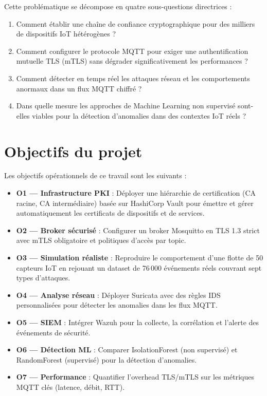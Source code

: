 Cette problématique se décompose en quatre sous-questions directrices :

\begin{enumerate}
  \item Comment établir une chaîne de confiance cryptographique pour des milliers de dispositifs IoT hétérogènes ?
  \item Comment configurer le protocole MQTT pour exiger une authentification mutuelle TLS (mTLS) sans dégrader significativement les performances ?
  \item Comment détecter en temps réel les attaques réseau et les comportements anormaux dans un flux MQTT chiffré ?
  \item Dans quelle mesure les approches de Machine Learning non supervisé sont-elles viables pour la détection d'anomalies dans des contextes IoT réels ?
\end{enumerate}

\section{Objectifs du projet}

Les objectifs opérationnels de ce travail sont les suivants :

\begin{itemize}
  \item \textbf{O1 — Infrastructure PKI} : Déployer une hiérarchie de certification (CA racine, CA intermédiaire) basée sur HashiCorp Vault pour émettre et gérer automatiquement les certificats de dispositifs et de services.
  \item \textbf{O2 — Broker sécurisé} : Configurer un broker Mosquitto en TLS 1.3 strict avec mTLS obligatoire et politiques d'accès par topic.
  \item \textbf{O3 — Simulation réaliste} : Reproduire le comportement d'une flotte de 50 capteurs IoT en rejouant un dataset de 76\,000 événements réels couvrant sept types d'attaques.
  \item \textbf{O4 — Analyse réseau} : Déployer Suricata avec des règles IDS personnalisées pour détecter les anomalies dans les flux MQTT.
  \item \textbf{O5 — SIEM} : Intégrer Wazuh pour la collecte, la corrélation et l'alerte des événements de sécurité.
  \item \textbf{O6 — Détection ML} : Comparer IsolationForest (non supervisé) et RandomForest (supervisé) pour la détection d'anomalies.
  \item \textbf{O7 — Performance} : Quantifier l'overhead TLS/mTLS sur les métriques MQTT clés (latence, débit, RTT).
\end{itemize}

